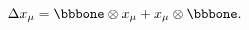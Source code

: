 \begin{equation}\label{16c}
  \Delta x_\mu = \bbbone \otimes x_\mu + x_\mu \otimes \bbbone.
\end{equation}

